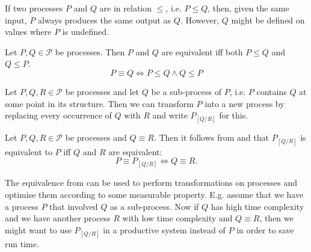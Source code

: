 

If two processes $P$ and $Q$ are in relation $\leq$, i.e. $P \leq Q$, then, given the same input, $P$ always produces the same output as $Q$. However, $Q$ might be defined on values where $P$ is undefined.

\begin{definition}
\label{def:process_equivalence}
Let $P, Q \in \mathcal{P}$ be processes. Then $P$ and $Q$ are equivalent iff both $P \leq Q$ and $Q \leq P$.
  \begin{equation}
    \label{eqn:equivalence}
    P \equiv Q \Leftrightarrow P \leq Q \wedge Q \leq P
  \end{equation}
  \hfill\qedsymbol
\end{definition}


\begin{definition}
\label{def:process_substitution}
Let $P, Q, R \in \mathcal{P}$ be processes and let $Q$ be a sub-process of $P$, i.e. $P$ contains $Q$ at some point in its structure. Then we can transform $P$ into a new process by replacing every occurrence of $Q$ with $R$ and write $P_{\left[ Q / R \right]}$ for this.

\hfill\qedsymbol
\end{definition}



\begin{corollary}
\label{crl:process_substitution}
Let $P, Q, R \in \mathcal{P}$ be processes and $Q \equiv R$. Then it follows from  and  that $P_{\left[ Q / R \right]}$ is equivalent to $P$ iff $Q$ and $R$ are equivalent:
  \begin{equation}
    P \equiv P_{\left[ Q / R \right]} \Leftrightarrow Q \equiv R.
  \end{equation}
  \hfill\qedsymbol
\end{corollary}

The equivalence from  can be used to perform transformations on processes and optimise them according to some measurable property. E.g. assume that we have a process $P$ that involved $Q$ as a sub-process. Now if $Q$ has high time complexity and we have another process $R$ with low time complexity and $Q \equiv R$, then we might want to use $P_{\left[ Q / R \right]}$ in a productive system instead of $P$ in order to save run time.


